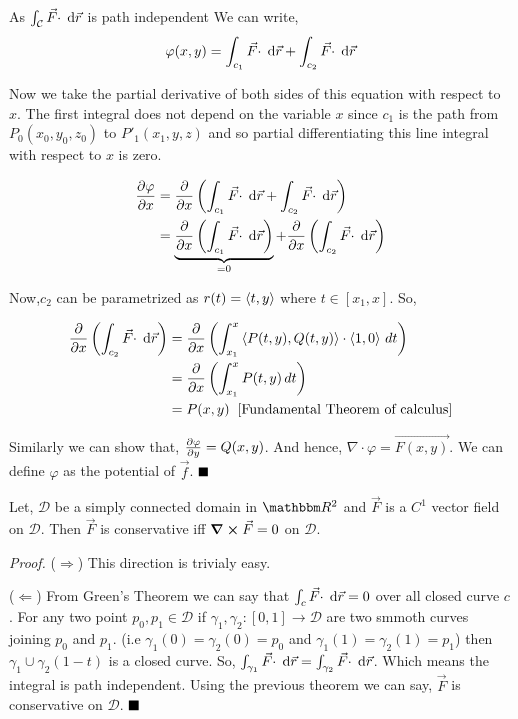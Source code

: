 \documentclass[Analysis-3]{subfiles}
\begin{document}
As $\int_{\mathcal{C}} {\vec{F} \cdot } \hspace{0.1cm} \dd {\vec{r}}$ is path independent We can write, \[
    \varphi(x,y) = \int_{c_1} {\vec{F} \cdot } \hspace{0.1cm} \dd {\vec{r}} + \int_{c_2} {\vec{F} \cdot } \hspace{0.1cm} \dd {\vec{r}}
\]

Now we take the partial derivative of both sides of this equation with respect to $x$. The first integral does not depend on the variable $x$ since $c_1$ is the path from $P_0(x_0,y_0,z_0)$ to $P'_1(x_1,y,z)$ and so partial differentiating this line integral with respect to $x$ is zero.

\begin{align*}
    \pdv{\varphi}{x} &=\pdv{x} \left( \int_{c_1} {\vec{F} \cdot } \hspace{0.1cm} \dd {\vec{r}} + \int_{c_2} {\vec{F} \cdot } \hspace{0.1cm} \dd {\vec{r}} \right)  \\
    &= \underbrace{\pdv{x} \left( \int_{c_1} {\vec{F} \cdot } \hspace{0.1cm} \dd {\vec{r}}\right)}_{= 0}  + \pdv{x} \left(\int_{c_2} {\vec{F} \cdot } \hspace{0.1cm} \dd {\vec{r}} \right) 
\end{align*}

Now,$c_2$ can be parametrized as $r(t) = \left\langle {t}, {y} \right\rangle$ where $t \in [x_1,x]$. So,

\begin{align*}
    \pdv{x} \left(\int_{c_2} {\vec{F} \cdot } \hspace{0.1cm} \dd {\vec{r}}\right) &= \pdv{x} \left( \int_{x_1}^x \left\langle {P(t,y)}, {Q(t,y)} \right\rangle \cdot \left\langle {1}, {0} \right\rangle \,d t \right) \\ 
    &= \pdv{x} \left( \int_{x_1}^x P(t,y) \,d t \right) \\
    &= P(x,y) \hspace{0.2cm} \text{[Fundamental Theorem of calculus]}
\end{align*}

Similarly we can show that, $\pdv{\varphi}{y} = Q(x,y)$. And hence,  $ \nabla \cdot \varphi = \vec{F(x,y)}$. We can define $\varphi$ as the potential of $\vec{f}$. $\hfill \blacksquare$

\begin{Thm}{}{}
    Let, $\mathcal{D}$ be a simply connected domain in $\R^2$ and $\vec{F}$ is a $C^1$ vector field on $\mathcal{D}$. Then $\vec{F}$ is conservative iff $\curl \vec{F} = 0$ on $\mathcal{D}$.
\end{Thm}

\textit{Proof.} ($\Rightarrow$) This direction is trivialy easy.

\vspace{0.2cm}

($\Leftarrow$) From Green's Theorem we can say that $ \int_{c} {\vec{F} \cdot } \hspace{0.1cm} \dd {\vec{r}} = 0$ over all closed curve $c$. For any two point $p_0,p_1 \in \mathcal{D}$ if $\gamma_1, \gamma_2 : [0,1] \to \mathcal{D}$ are two smmoth curves joining $p_0$ and $p_1$. (i.e $\gamma_1(0) = \gamma_2 (0) = p_0$ and $\gamma_1(1) = \gamma_2(1) = p_1$) then $\gamma_1 \cup \gamma_2(1-t)$ is a closed curve. So, $ \int_{\gamma_1} {\vec{F} \cdot } \hspace{0.1cm} \dd {\vec{r}}  = \int_{\gamma_2} {\vec{F} \cdot } \hspace{0.1cm} \dd {\vec{r}}$. Which means the integral is path independent. Using the previous theorem we can say, $\vec{F}$ is conservative on $\mathcal{D}$. $\hfill \blacksquare$
\end{document}
